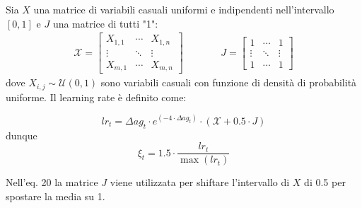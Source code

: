Sia $X$ una matrice di variabili casuali uniformi e indipendenti nell'intervallo $[0,1]$ e $J$ una matrice di tutti "1":
\begin{eqnarray*}
	\mathcal{X} =
	\begin{bmatrix}
		X_{1,1} & \cdots & X_{1,n}\\
		\vdots & \ddots & \vdots\\
		X_{m,1} & \cdots & X_{m,n}
	\end{bmatrix}
	\hspace{45pt}
	J = 
	\begin{bmatrix}
		1 & \cdots & 1\\
		\vdots & \ddots & \vdots\\
		1 & \cdots & 1
	\end{bmatrix}
\end{eqnarray*}
dove $X_{i,j} \sim \mathcal{U}(0,1)$ sono variabili casuali con funzione di densità di probabilità uniforme. Il learning rate è definito come:

\begin{equation}
	lr_{t} = \Delta ag_{t} \cdot e^{(-4\cdot\Delta ag_{t})} \cdot (\mathcal{X} + 0.5 \cdot J)
\end{equation}
dunque
\begin{equation}
	\xi_{t} = 1.5 \cdot \frac{lr_{t}}{\max(lr_{t})}
\end{equation}

Nell'eq. 20 la matrice $J$ viene utilizzata per shiftare l'intervallo di $X$ di 0.5 per spostare la media su 1.
